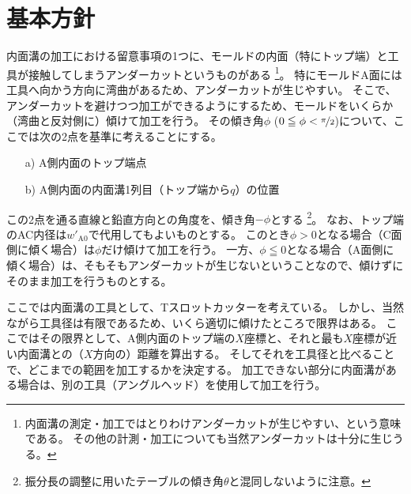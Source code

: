 \section{基本方針}
内面溝の加工における留意事項の1つに、モールドの内面（特にトップ端）と工具が接触してしまうアンダーカットというものがある
\footnote{内面溝の測定・加工ではとりわけアンダーカットが生じやすい、という意味である。
その他の計測・加工についても当然アンダーカットは十分に生じうる。}。
特にモールドA面には工具へ向かう方向に湾曲があるため、アンダーカットが生じやすい。
そこで、アンダーカットを避けつつ加工ができるようにするため、モールドをいくらか（湾曲と反対側に）傾けて加工を行う。
その傾き角$\phi$ ($0 \leqq \phi < \nicefrac\pi2$)について、ここでは次の2点を基準に考えることにする。
\begin{tcolorbox}[title=A面の内面溝, fonttitle=\gtfamily\bfseries]
\begin{enumerate}
\item[a)]
A側内面のトップ端点
\item[b)]
A側内面の内面溝1列目（トップ端から$q$）の位置
\end{enumerate}
\end{tcolorbox}\noindent
この2点を通る直線と鉛直方向との角度を、傾き角$-\phi$とする
\footnote{振分長の調整に用いたテーブルの傾き角$\theta$と混同しないように注意。}。
なお、トップ端のAC内径は$w'_{\mathrm A0}$で代用してもよいものとする。
このとき$\phi > 0$となる場合（C面側に傾く場合）は$\phi$だけ傾けて加工を行う。
一方、$\phi \leqq 0$となる場合（A面側に傾く場合）は、そもそもアンダーカットが生じないということなので、傾けずにそのまま加工を行うものとする。
\begin{hosoku}
ここでは内面溝の工具として、Tスロットカッターを考えている。
しかし、当然ながら工具径は有限であるため、いくら適切に傾けたところで限界はある。
ここではその限界として、A側内面のトップ端の$X$座標と、それと最も$X$座標が近い内面溝との（$X$方向の）距離を算出する。
そしてそれを工具径と比べることで、どこまでの範囲を加工するかを決定する。
加工できない部分に内面溝がある場合は、別の工具（アングルヘッド）を使用して加工を行う。
\end{hosoku}
